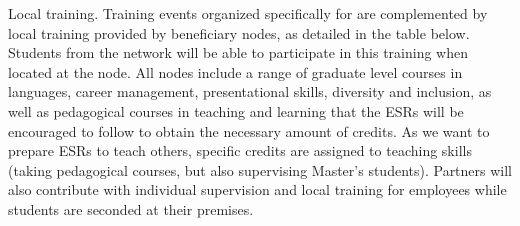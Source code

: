 \noindent \color{blue}Local training. \color{black}
Training events organized specifically for \acronym are complemented by local training provided by beneficiary nodes, as detailed in the table below. 
Students from the network will be able to participate in this training when located at the node. 
All nodes include a range of graduate level courses in languages, career management, presentational skills, diversity and inclusion, as  well as pedagogical courses in teaching and learning that the ESRs will be encouraged to follow to obtain the necessary amount of credits. 
As we want to prepare ESRs to teach others, specific credits are assigned to teaching skills (taking pedagogical courses, but also supervising Master's students). 
Partners will also contribute with individual supervision and local training for employees while students are seconded at their premises. 

